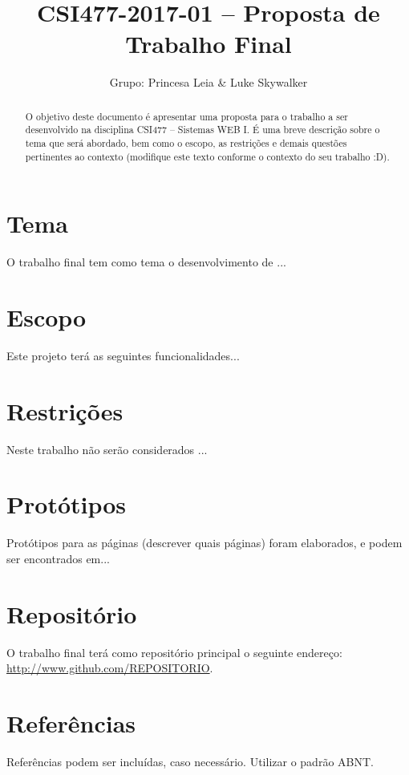 \documentclass[10pt,a4paper,article]{abntex2}
\title{CSI477-2017-01 -- Proposta de Trabalho Final}
\author{Grupo: Princesa Leia \& Luke Skywalker}
\begin{document}
	\maketitle

	\begin{abstract}
		O objetivo deste documento é apresentar uma proposta para o trabalho a ser desenvolvido na disciplina CSI477 -- Sistemas WEB I. É uma breve descrição sobre o tema que será abordado, bem como o escopo, as restrições e demais questões pertinentes ao contexto (modifique este texto conforme o contexto do seu trabalho :D).
	\end{abstract}

	\section{Tema}

		O trabalho final tem como tema o desenvolvimento de ...

	\section{Escopo}

		Este projeto terá as seguintes funcionalidades...

	\section{Restrições}

		Neste trabalho não serão considerados ...

	\section{Protótipos}
		  Protótipos para as páginas (descrever quais páginas) foram elaborados, e podem ser encontrados em...

	\section{Repositório}

		O trabalho final terá como repositório principal o seguinte endereço: \url{http://www.github.com/REPOSITORIO}.

	\section{Referências}
	Referências podem ser incluídas, caso necessário. Utilizar o padrão ABNT.
\end{document}
